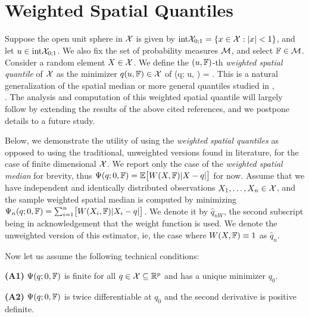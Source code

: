 \section{Weighted Spatial Quantiles}
\label{Sec:WSQuantiles}

Suppose the open unit sphere in $\mathcal{X}$ is given by 
$\textrm{int} {\mathcal{X}}_{0; 1} = \{ x \in \mathcal{X}: | x | < 1 \}$, and let
 $u \in \textrm{int} {\mathcal{X}}_{0; 1}$. We also fix the set of probability measures $\mathcal{M}$, 
 and select ${\mathbb{F}} \in \mathcal{M}$. Consider a random element $X \in \mathcal{X}$. 
We define the $(u, {\mathbb{F}})$-th \textit{weighted spatial quantile} of $\mathcal{X}$ 
as the minimizer $q (u, {\mathbb{F}}) \in \mathcal{X}$ of 
\baq
\Psi (q; u, \BF) = \BE {}.
\label{eq:WeightedQuantile}
\eaq
This is a natural generalization of the spatial median or more general quantiles 
studied in 
\cite{ref:Biometrika48414_Haldane, ref:JASA96862_Chaudhuri, 
ref:AoS97435_Koltchinskii}, \\
\cite{ref:AoS141203_ChakrabortyChaudhuri_Banach_Quantile,
ref:Bernoulli152308_Minsker_Median_Banach, ref:AoS17591_Cardotetal_Median_HilbertSpace}.
The  analysis and computation of this weighted spatial quantile will largely follow by 
extending the results of
the above cited references, and we postpone details to a future study. 

Below,  we  demonstrate the utility of using the 
\textit{weighted spatial quantiles} as opposed to using the traditional, 
unweighted versions found in literature, for the case of finite dimensional $\mathcal{X}$. 
We report only the case of the \textit{weighted spatial median} for brevity, thus 
$\Psi (q; 0, {\mathbb{F}}) = {\mathbb{E}} \bigl[ W (X, {\mathbb{F}}) | X - q | \bigr] $ for now.
Assume that we have independent and identically distributed observations 
$X_{1}, \ldots, X_{n} \in \mathcal{X}$, and the sample weighted spatial median is computed by 
minimizing $\Psi_{n} (q; 0, {\mathbb{F}}) = \sum_{i = 1}^{n} \bigl[ W (X_{i}, {\mathbb{F}}) | X_{i} - q | \bigr] $. We denote it by $\hat{q}_{nW}$, the second subscript being in acknowledgement that the weight 
function is used. We denote the unweighted version of this estimator, ie, the case where 
$W (X, {\mathbb{F}}) \equiv 1$ as $\hat{q}_{n}$.

Now let us assume the following technical conditions:

\vspace{1em}
\noindent\textbf{(A1)} $\Psi (q; 0, {\mathbb{F}})$ is finite for all $q \in \mathcal{X} \subseteq {\mathbb{R}}^{p}$ 
and has a unique minimizer $q_{0}$. 

\noindent\textbf{(A2)} $\Psi (q; 0, {\mathbb{F}})$ is twice differentiable at $q_{0}$ and the second 
 derivative is positive definite. 
 
